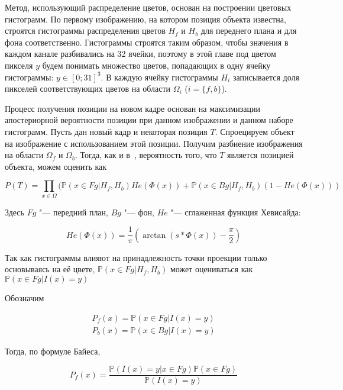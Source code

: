Метод, использующий распределение цветов, основан на построении цветовых
гистограмм.
По первому изображению, на котором позиция объекта известна, строятся
гистограммы распределения цветов $H_f$ и $H_b$ для переднего плана и для фона
соответственно.
Гистограммы строятся таким образом, чтобы значения в каждом канале разбивались
на 32 ячейки, поэтому в этой главе под цветом пикселя $y$ будем понимать
множество цветов, попадающих в одну ячейку гистограммы: $y \in [0; 31]^3$.
В каждую ячейку гистограммы $H_i$ записывается доля пикселей соответствующих
цветов на области $\Omega_i$ ($i = \{f, b\}$).

Процесс получения позиции на новом кадре основан на максимизации апостериорной
вероятности позиции при данном изображении и данном
наборе гистограмм.
Пусть дан новый кадр и некоторая позиция $T$.
Спроецируем объект на изображение с использованием этой позиции.
Получим разбиение изображения на области $\Omega_f$ и $\Omega_b$.
Тогда, как и в~\cite{Hexner2016}, вероятность того, что $T$
является позицией объекта, можем оценить как

\begin{equation}
\label{eqn:pos_prob}
P(T) = \prod\limits_{x \in \Omega}(\mathbb{P}(x \in Fg | H_f, H_b) He(\Phi(x))
+ \mathbb{P}(x \in Bg|H_f, H_b)(1 - He(\Phi(x)))
\end{equation}


Здесь $Fg$ "--- передний план, $Bg$ "--- фон, $He$ "--- сглаженная функция
Хевисайда:

\begin{equation}
\label{eqn:heaviside}
    He(\Phi(x)) = \frac{1}{\pi} (\arctan(s * \Phi(x)) - \frac{\pi}{2})
\end{equation}

Так как гистограммы влияют на принадлежность точки проекции только основываясь
на её цвете,
$\mathbb{P}(x \in Fg | H_f, H_b)$
может оцениваться как
$\mathbb{P}(x \in Fg | I(x) = y)$

Обозначим

\begin{equation}
\label{eqn:Pfx}
\begin{array}{c}
P_f(x) = \mathbb{P}(x \in Fg | I(x) = y) \\
P_b(x) = \mathbb{P}(x \in Bg | I(x) = y)
\end{array}
\end{equation}

Тогда, по формуле Байеса,

\begin{equation}
\label{eqn:Bayes}
P_f(x)= \frac{\mathbb{P}(I(x) = y | x \in Fg) 
\mathbb{P}(x \in Fg)}{\mathbb{P}(I(x) = y)}
\end{equation}


